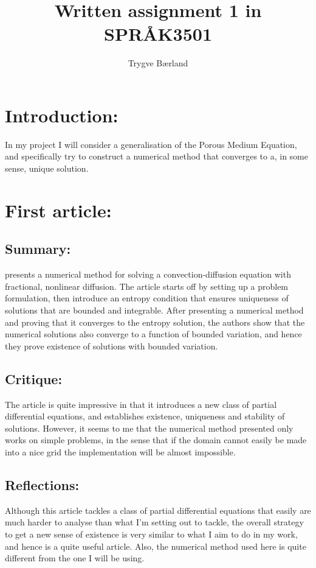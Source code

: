 \documentclass[11pt, a4paper]{article}
\begin{document}
\title{Written assignment 1 in SPRÅK3501}
\author{Trygve Bærland}
\maketitle
\section*{Introduction:}
In my project I will consider a generalisation of the Porous Medium Equation, and specifically try to construct a numerical method that converges to a, in some sense, unique solution.

\section*{First article:}
\subsection*{Summary:}
\cite{Cifani} presents a numerical method for solving a convection-diffusion equation with fractional, nonlinear diffusion. The article starts off by setting up a problem formulation, then introduce an entropy condition that ensures uniqueness of solutions that are bounded and integrable. After presenting a numerical method and proving that it converges to the entropy solution, the authors show that the numerical solutions also converge to a function of bounded variation, and hence they prove existence of solutions with bounded variation.

\subsection*{Critique:}
The article is quite impressive in that it introduces a new class of partial differential equations, and establishes existence, uniqueness and stability of solutions. However, it seems to me that the numerical method presented only works on simple problems, in the sense that if the domain cannot easily be made into a nice grid the implementation will be almost impossible.

\subsection*{Reflections:}
Although this article tackles a class of partial differential equations that easily are much harder to analyse than what I'm setting out to tackle, the overall strategy to get a new sense of existence is very similar to what I aim to do in my work, and hence is a quite useful article. Also, the numerical method used here is quite different from the one I will be using.
\end{document}

